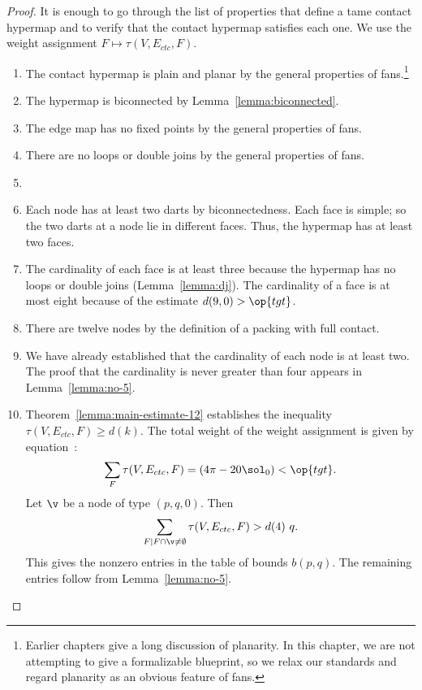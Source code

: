 \begin{proof} It is enough to go through the list of properties that
  define a tame contact hypermap and to verify that the contact
  hypermap satisfies each one.  We use the weight assignment $F\mapsto
  \tau(V,E_{ctc},F)$.

\begin{enumerate}
\item {} The contact hypermap is plain and planar by the
  general properties of fans.\footnote{Earlier chapters give a long
    discussion of planarity.  In this chapter, we are not attempting
    to give a formalizable blueprint, so we relax our standards and
    regard planarity as an obvious feature of fans.}
\item {} The hypermap is biconnected by
  Lemma~\ref{lemma:biconnected}.
\item {} The
  edge map has no fixed points by the general properties of fans.
\item {}
  There are no loops or double joins by the general properties of
  fans.
\item {} 
\item {} Each node has at least two darts by
  biconnectedness. Each face is simple; so the two darts at a node lie
  in different faces.  Thus, the hypermap has at least two faces.
\item {} The cardinality of each face is at least three
  because the hypermap has no loops or double joins (Lemma~\ref{lemma:dj}).
  The cardinality of a face is at most eight because of the estimate
  $d(9,0)>\op{tgt}$.
\item {} There are twelve nodes by the definition of a
  packing with full contact.
\item {} We have already established that the cardinality
  of each node is at least two.  The proof that the cardinality is
  never  greater than four appears in Lemma~\ref{lemma:no-5}.
\item {} Theorem~\ref{lemma:main-estimate-12} establishes 
 the inequality $\tau(V,E_{ctc},F)\ge d(k)$.
  The total weight of the weight assignment is given by
  equation~:
\[
  \sum_F \tau(V,E_{ctc},F) = (4\pi - 20\sol_0) < \op{tgt}.
\]
%
Let $\v$ be a node of type $(p,q,0)$.  
Then
\[
\sum_{F\mid F\cap \v\ne\emptyset}\tau(V,E_{ctc},F) > d(4)~q.
\]
This gives the nonzero entries in the table of bounds $b(p,q)$.  The
remaining entries follow from Lemma~\ref{lemma:no-5}.
\end{enumerate}
\end{proof}





